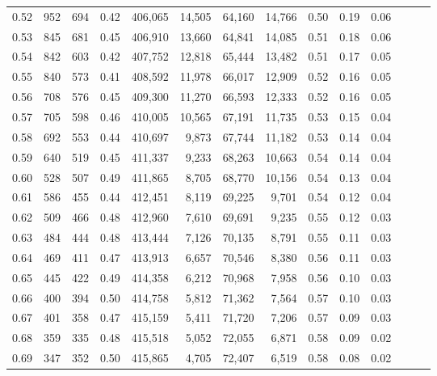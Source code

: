 \begin{tabular}{rrrrrrrrrrrrrr}
0.52 &     952 &    694 &  0.42 &  406,065 &   14,505 &  64,160 &  14,766 &  0.50 &  0.19 &      0.06 \\
0.53 &     845 &    681 &  0.45 &  406,910 &   13,660 &  64,841 &  14,085 &  0.51 &  0.18 &      0.06 \\
0.54 &     842 &    603 &  0.42 &  407,752 &   12,818 &  65,444 &  13,482 &  0.51 &  0.17 &      0.05 \\
0.55 &     840 &    573 &  0.41 &  408,592 &   11,978 &  66,017 &  12,909 &  0.52 &  0.16 &      0.05 \\
0.56 &     708 &    576 &  0.45 &  409,300 &   11,270 &  66,593 &  12,333 &  0.52 &  0.16 &      0.05 \\
0.57 &     705 &    598 &  0.46 &  410,005 &   10,565 &  67,191 &  11,735 &  0.53 &  0.15 &      0.04 \\
0.58 &     692 &    553 &  0.44 &  410,697 &    9,873 &  67,744 &  11,182 &  0.53 &  0.14 &      0.04 \\
0.59 &     640 &    519 &  0.45 &  411,337 &    9,233 &  68,263 &  10,663 &  0.54 &  0.14 &      0.04 \\
0.60 &     528 &    507 &  0.49 &  411,865 &    8,705 &  68,770 &  10,156 &  0.54 &  0.13 &      0.04 \\
0.61 &     586 &    455 &  0.44 &  412,451 &    8,119 &  69,225 &   9,701 &  0.54 &  0.12 &      0.04 \\
0.62 &     509 &    466 &  0.48 &  412,960 &    7,610 &  69,691 &   9,235 &  0.55 &  0.12 &      0.03 \\
0.63 &     484 &    444 &  0.48 &  413,444 &    7,126 &  70,135 &   8,791 &  0.55 &  0.11 &      0.03 \\
0.64 &     469 &    411 &  0.47 &  413,913 &    6,657 &  70,546 &   8,380 &  0.56 &  0.11 &      0.03 \\
0.65 &     445 &    422 &  0.49 &  414,358 &    6,212 &  70,968 &   7,958 &  0.56 &  0.10 &      0.03 \\
0.66 &     400 &    394 &  0.50 &  414,758 &    5,812 &  71,362 &   7,564 &  0.57 &  0.10 &      0.03 \\
0.67 &     401 &    358 &  0.47 &  415,159 &    5,411 &  71,720 &   7,206 &  0.57 &  0.09 &      0.03 \\
0.68 &     359 &    335 &  0.48 &  415,518 &    5,052 &  72,055 &   6,871 &  0.58 &  0.09 &      0.02 \\
0.69 &     347 &    352 &  0.50 &  415,865 &    4,705 &  72,407 &   6,519 &  0.58 &  0.08 &      0.02 \\

\end{tabular}
